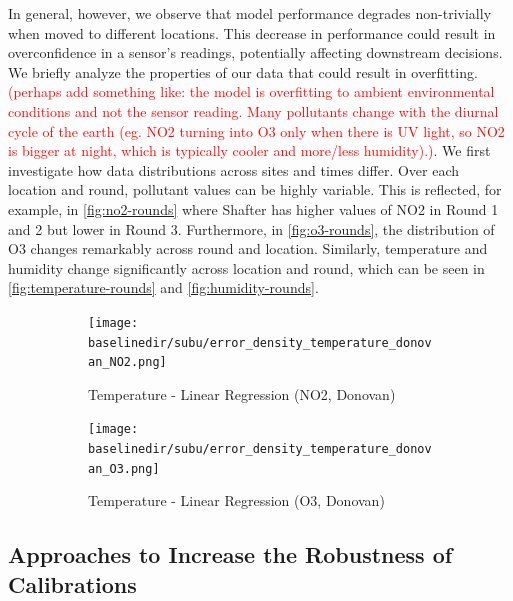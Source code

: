 \documentclass[journal abbreviation, manuscript]{copernicus}
\newcommand\todo[1]{\textcolor{red}{#1}}
\begin{document}
In general, however, we observe that model performance degrades non-trivially
when moved to different locations. This decrease in performance could result in overconfidence in a sensor's readings, potentially affecting downstream decisions. We briefly analyze the properties of our data that could result in overfitting.
\todo{(perhaps add something like: the model is overfitting to ambient environmental conditions and not the sensor reading. Many pollutants change with the diurnal cycle of the earth (eg. NO2 turning into O3 only when there is UV light, so NO2 is bigger at night, which is typically cooler and more/less humidity).)}.
We first investigate how data distributions across sites and times differ. Over each location and round, pollutant values can be highly variable. This is reflected, for example, in \autoref{fig:no2-rounds} where Shafter has higher values of NO2 in Round 1 and 2 but lower in Round 3. Furthermore, in \autoref{fig:o3-rounds}, the distribution of O3 changes remarkably across round and location.
Similarly, temperature and humidity change significantly across location and round, which can be seen in \autoref{fig:temperature-rounds} and \autoref{fig:humidity-rounds}.

\begin{figure}[H]
\centering
\begin{subfigure}{0.45\textwidth}
\texttt{[image: \\baselinedir/subu/error\_density\_temperature\_donovan\_NO2.png]}
\caption{Temperature - Linear Regression (NO2, Donovan)}
\end{subfigure}
\begin{subfigure}{0.45\textwidth}
\texttt{[image: \\baselinedir/subu/error\_density\_temperature\_donovan\_O3.png]}
\caption{Temperature - Linear Regression (O3, Donovan)}
\end{subfigure}
\caption{}
\label{fig:error-density}
\end{figure}

\subsection{Approaches to Increase the Robustness of Calibrations}
\end{document}
